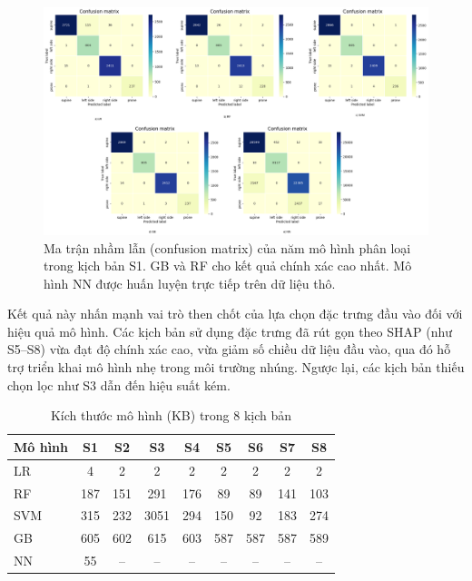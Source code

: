 \begin{figure}[htbp]
    \centering
    \includegraphics[width=\linewidth]{images/matrix (2).png}
    \caption{Ma trận nhầm lẫn (confusion matrix) của năm mô hình 
    phân loại trong kịch bản S1. GB và RF cho kết quả chính xác 
    cao nhất. Mô hình NN được huấn luyện trực tiếp trên dữ liệu thô.}
    \label{fig:cm_all_models}
\end{figure}

Kết quả này nhấn mạnh vai trò then chốt của lựa chọn đặc trưng đầu vào đối với hiệu quả mô hình. Các kịch bản sử dụng đặc trưng đã rút gọn theo SHAP (như S5–S8) vừa đạt độ chính xác cao, vừa giảm số chiều dữ liệu đầu vào, qua đó hỗ trợ triển khai mô hình nhẹ trong môi trường nhúng. Ngược lại, các kịch bản thiếu chọn lọc như S3 dẫn đến hiệu suất kém.

\begin{table}[htbp]
\caption{Kích thước mô hình (KB) trong 8 kịch bản}
\label{tab:modelsize}
\centering
\renewcommand{\arraystretch}{1.1}
\scriptsize
\begin{tabular}{|l|c|c|c|c|c|c|c|c|}
\hline
\textbf{Mô hình} & S1 & S2 & S3 & S4 & S5 & S6 & S7 & S8 \\
\hline
LR  & 4   & 2   & 2    & 2   & 2   & 2   & 2   & 2   \\
RF  & 187 & 151 & 291  & 176 & 89  & 89  & 141 & 103 \\
SVM & 315 & 232 & 3051 & 294 & 150 & 92  & 183 & 274 \\
GB  & 605 & 602 & 615  & 603 & 587 & 587 & 587 & 589 \\
NN  & 55  & --  & --   & --  & --  & --  & --  & --   \\
\hline
\end{tabular}
\end{table}

